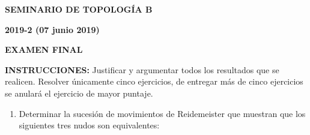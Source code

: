 \documentclass[12pt]{report}
\begin{document}
\begin{center}
\textbf{\LARGE {SEMINARIO DE TOPOLOGÍA B}}
\end{center}

\begin{center}
\textbf{{\large 2019-2 (07 junio 2019)}}
\end{center}

\begin{center}
\textbf{{\large EXAMEN FINAL}}
\end{center}

{\bf INSTRUCCIONES:} Justificar y argumentar todos los resultados que se realicen. Resolver únicamente cinco ejercicios, de entregar más de cinco ejercicios se anulará el ejercicio de mayor puntaje.

\begin{enumerate}
\item Determinar la sucesión de movimientos de Reidemeister que muestran que los siguientes tres nudos son equivalentes:


\end{enumerate}
\end{document}
